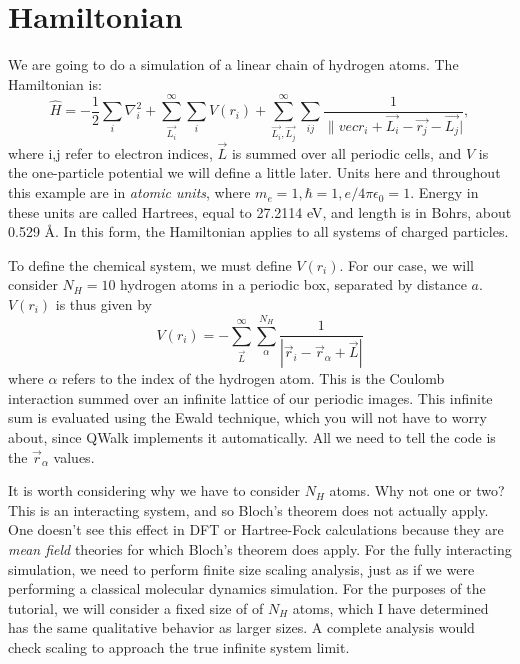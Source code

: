 \documentclass[12pt]{article}
\begin{document}
\section*{Hamiltonian}

We are going to do a simulation of a linear chain of hydrogen atoms. 
The Hamiltonian is:
\begin{equation}
\hat{H}=-\frac{1}{2}\sum_i \nabla_i^2 + \sum_{\vec{L_i}}^\infty\sum_i V(r_i) + \sum_{\vec{L_i},\vec{L_j} }^\infty \sum_{ij} \frac{1}{\|vec{r}_i+\vec{L_i}-\vec{r_j}-\vec{L_j}|},
\end{equation}
where i,j refer to electron indices, $\vec{L}$ is summed over all periodic cells, and $V$ is the one-particle potential we will define a little later.
Units here and throughout this example are in {\it atomic units}, where $m_e=1,\hbar=1,e/4\pi\epsilon_0=1$.
Energy in these units are called Hartrees, equal to 27.2114 eV, and length is in Bohrs, about 0.529 \AA.
In this form, the Hamiltonian applies to all systems of charged particles. 

To define the chemical system, we must define $V(r_i)$. For our case, we will consider $N_H=10$ hydrogen atoms in a periodic box, separated by distance $a$.
$V(r_i)$ is thus given by 
\begin{equation}
V(r_i)	= -\sum_{\vec{L}}^\infty \sum_\alpha^{N_H} \frac{1}{|\vec{r}_i -\vec{r}_\alpha+\vec{L}|}
\end{equation}
where $\alpha$ refers to the index of the hydrogen atom.
This is the Coulomb interaction summed over an infinite lattice of our periodic images.
This infinite sum is evaluated using the Ewald technique, which you will not have to worry about, since QWalk implements it automatically. 
All we need to tell the code is the $\vec{r}_\alpha$ values.

It is worth considering why we have to consider $N_H$ atoms.
Why not one or two?
This is an interacting system, and so Bloch's theorem does not actually apply.
One doesn't see this effect in DFT or Hartree-Fock calculations because they are {\it mean field} theories for which Bloch's theorem does apply. 
For the fully interacting simulation, we need to perform finite size scaling analysis, just as if we were performing a classical molecular dynamics simulation.
For the purposes of the tutorial, we will consider a fixed size of of $N_H$ atoms, which I have determined has the same qualitative behavior as larger sizes.
A complete analysis would check scaling to approach the true infinite system limit.
\end{document}
